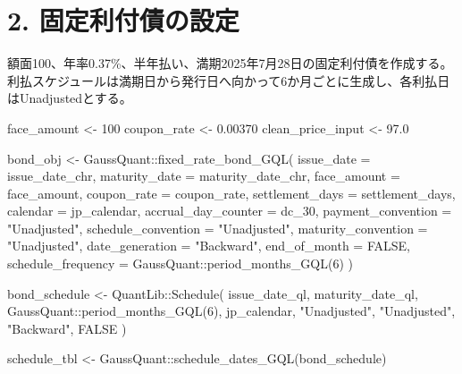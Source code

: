 \documentclass[
  letterpaper,
  DIV=11,
  numbers=noendperiod]{scrreprt}
\newenvironment{Shaded}{\begin{snugshade}}{\end{snugshade}}
\newcommand{\AttributeTok}[1]{\textcolor[rgb]{0.40,0.45,0.13}{#1}}
\newcommand{\ConstantTok}[1]{\textcolor[rgb]{0.56,0.35,0.01}{#1}}
\newcommand{\DecValTok}[1]{\textcolor[rgb]{0.68,0.00,0.00}{#1}}
\newcommand{\FloatTok}[1]{\textcolor[rgb]{0.68,0.00,0.00}{#1}}
\newcommand{\FunctionTok}[1]{\textcolor[rgb]{0.28,0.35,0.67}{#1}}
\newcommand{\NormalTok}[1]{\textcolor[rgb]{0.00,0.23,0.31}{#1}}
\newcommand{\OtherTok}[1]{\textcolor[rgb]{0.00,0.23,0.31}{#1}}
\newcommand{\SpecialCharTok}[1]{\textcolor[rgb]{0.37,0.37,0.37}{#1}}
\newcommand{\StringTok}[1]{\textcolor[rgb]{0.13,0.47,0.30}{#1}}
\begin{document}
\section{2.
固定利付債の設定}\label{ux56faux5b9aux5229ux4ed8ux50b5ux306eux8a2dux5b9a}

額面100、年率0.37\%、半年払い、満期2025年7月28日の固定利付債を作成する。利払スケジュールは満期日から発行日へ向かって6か月ごとに生成し、各利払日はUnadjustedとする。

\begin{Shaded}
\begin{Highlighting}[]
\NormalTok{face\_amount }\OtherTok{\textless{}{-}} \DecValTok{100}
\NormalTok{coupon\_rate }\OtherTok{\textless{}{-}} \FloatTok{0.00370}
\NormalTok{clean\_price\_input }\OtherTok{\textless{}{-}} \FloatTok{97.0}

\NormalTok{bond\_obj }\OtherTok{\textless{}{-}}\NormalTok{ GaussQuant}\SpecialCharTok{::}\FunctionTok{fixed\_rate\_bond\_GQL}\NormalTok{(}
  \AttributeTok{issue\_date =}\NormalTok{ issue\_date\_chr,}
  \AttributeTok{maturity\_date =}\NormalTok{ maturity\_date\_chr,}
  \AttributeTok{face\_amount =}\NormalTok{ face\_amount,}
  \AttributeTok{coupon\_rate =}\NormalTok{ coupon\_rate,}
  \AttributeTok{settlement\_days =}\NormalTok{ settlement\_days,}
  \AttributeTok{calendar =}\NormalTok{ jp\_calendar,}
  \AttributeTok{accrual\_day\_counter =}\NormalTok{ dc\_30,}
  \AttributeTok{payment\_convention =} \StringTok{"Unadjusted"}\NormalTok{,}
  \AttributeTok{schedule\_convention =} \StringTok{"Unadjusted"}\NormalTok{,}
  \AttributeTok{maturity\_convention =} \StringTok{"Unadjusted"}\NormalTok{,}
  \AttributeTok{date\_generation =} \StringTok{"Backward"}\NormalTok{,}
  \AttributeTok{end\_of\_month =} \ConstantTok{FALSE}\NormalTok{,}
  \AttributeTok{schedule\_frequency =}\NormalTok{ GaussQuant}\SpecialCharTok{::}\FunctionTok{period\_months\_GQL}\NormalTok{(}\DecValTok{6}\NormalTok{)}
\NormalTok{)}

\NormalTok{bond\_schedule }\OtherTok{\textless{}{-}}\NormalTok{ QuantLib}\SpecialCharTok{::}\FunctionTok{Schedule}\NormalTok{(}
\NormalTok{  issue\_date\_ql,}
\NormalTok{  maturity\_date\_ql,}
\NormalTok{  GaussQuant}\SpecialCharTok{::}\FunctionTok{period\_months\_GQL}\NormalTok{(}\DecValTok{6}\NormalTok{),}
\NormalTok{  jp\_calendar,}
  \StringTok{"Unadjusted"}\NormalTok{,}
  \StringTok{"Unadjusted"}\NormalTok{,}
  \StringTok{"Backward"}\NormalTok{,}
  \ConstantTok{FALSE}
\NormalTok{)}

\NormalTok{schedule\_tbl }\OtherTok{\textless{}{-}}\NormalTok{ GaussQuant}\SpecialCharTok{::}\FunctionTok{schedule\_dates\_GQL}\NormalTok{(bond\_schedule)}


\end{Highlighting}
\end{Shaded}
\end{document}
